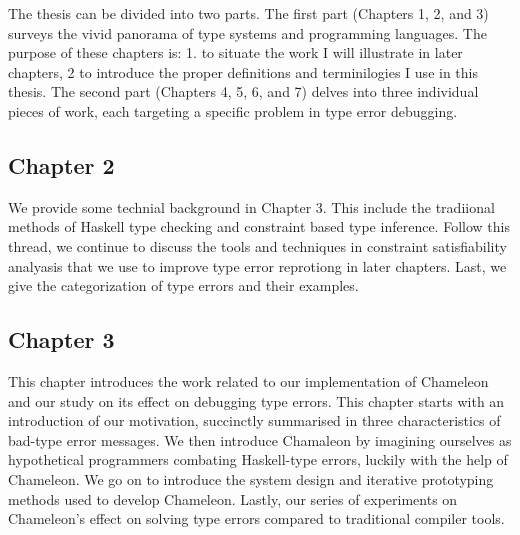 The thesis can be divided into two parts. The first part (Chapters 1, 2, and 3) surveys the vivid panorama of type systems and programming languages. The purpose of these chapters is: 1. to situate the work I will illustrate in later chapters, 2 to introduce the proper definitions and terminilogies I use in this thesis.  The second part (Chapters 4, 5, 6, and 7) delves into three individual pieces of work, each targeting a specific problem in type error debugging.





\subsection{Chapter 2}
We provide some technial background in Chapter 3. This include the tradiional methods of Haskell type checking and constraint based type inference. Follow this thread, we continue to discuss the tools and techniques in constraint satisfiability analyasis that we use to improve type error reprotiong in later chapters. Last, we give the categorization of type errors and their examples. 

\subsection{Chapter 3}
This chapter introduces the work related to our implementation of Chameleon and our study on its effect on debugging type errors. This chapter starts with an introduction of our motivation, succinctly summarised in three characteristics of bad-type error messages. We then introduce Chamaleon by imagining ourselves as hypothetical programmers combating Haskell-type errors, luckily with the help of Chameleon. We go on to introduce the system design and iterative prototyping methods used to develop Chameleon. Lastly, our series of experiments on Chameleon's effect on solving type errors compared to traditional compiler tools. 


